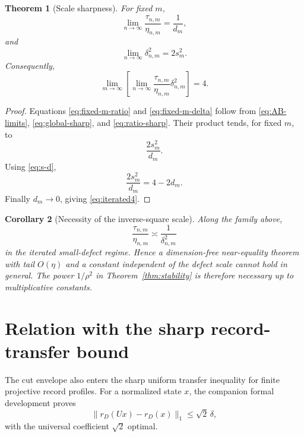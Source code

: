 \documentclass[11pt]{article}
\newtheorem{theorem}{Theorem}[section]
\newtheorem{corollary}[theorem]{Corollary}
\newcommand{\dd}{\delta}
\newcommand{\etaq}{\eta}
\newcommand{\tauq}{\tau}
\begin{document}
\begin{theorem}[Scale sharpness]\label{thm:scale-sharp}
For fixed $m$,
\begin{equation}\label{eq:fixed-m-ratio}
  \lim_{n\to\infty}
  \frac{\tauq_{n,m}}{\etaq_{n,m}}
  =
  \frac1{d_m},
\end{equation}
and
\begin{equation}\label{eq:fixed-m-delta}
  \lim_{n\to\infty}\dd_{n,m}^2=2s_m^2.
\end{equation}
Consequently,
\begin{equation}\label{eq:iterated4}
  \boxed{
  \lim_{m\to\infty}
  \left[
    \lim_{n\to\infty}
    \frac{\tauq_{n,m}}{\etaq_{n,m}}
    \dd_{n,m}^2
  \right]
  =4.
  }
\end{equation}
\end{theorem}

\begin{proof}
Equations \eqref{eq:fixed-m-ratio} and \eqref{eq:fixed-m-delta} follow from
\eqref{eq:AB-limits}, \eqref{eq:global-sharp}, and
\eqref{eq:ratio-sharp}.  Their product tends, for fixed $m$, to
\[
  \frac{2s_m^2}{d_m}.
\]
Using \eqref{eq:s-d},
\[
  \frac{2s_m^2}{d_m}
  =
  4-2d_m.
\]
Finally $d_m\to0$, giving \eqref{eq:iterated4}.
\end{proof}

\begin{corollary}[Necessity of the inverse-square scale]
Along the family above,
\[
  \frac{\tauq_{n,m}}{\etaq_{n,m}}
  \asymp \frac{1}{\dd_{n,m}^2}
\]
in the iterated small-defect regime.  Hence a dimension-free near-equality
theorem with tail $O(\etaq)$ and a constant independent of the defect scale
cannot hold in general.  The power $1/\rho^2$ in
Theorem~\ref{thm:stability} is therefore necessary up to multiplicative
constants.
\end{corollary}

\section{Relation with the sharp record-transfer bound}

The cut envelope also enters the sharp uniform transfer inequality for finite
projective record profiles.  For a normalized state $x$, the companion
formal development proves
\begin{equation}\label{eq:transfer}
  \|r_D(Ux)-r_D(x)\|_1
  \le
  \sqrt2\,\dd,
\end{equation}
with the universal coefficient $\sqrt2$ optimal.
\end{document}
